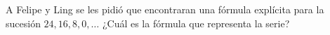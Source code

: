 \question[10] A Felipe y Ling se les pidió que encontraran una fórmula explícita para la sucesión $24,16,8,0, \dots$ 
¿Cu\'al es la f\'ormula que representa la serie? \fillin[$24-8(n-1)$]
